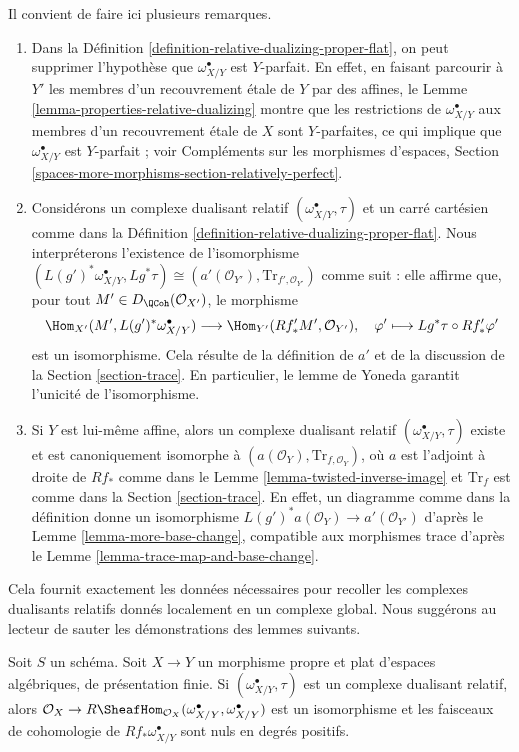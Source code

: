 \noindent
Il convient de faire ici plusieurs remarques.
\begin{enumerate}
\item Dans la Définition \ref{definition-relative-dualizing-proper-flat},
on peut supprimer l'hypothèse que $\omega_{X/Y}^\bullet$ est $Y$-parfait.
En effet, en faisant parcourir à $Y'$ les membres d'un recouvrement \'etale de $Y$
par des affines, le Lemme \ref{lemma-properties-relative-dualizing} montre
que les restrictions de $\omega_{X/Y}^\bullet$ aux membres d'un
recouvrement \'etale de $X$ sont $Y$-parfaites, ce qui implique que
$\omega_{X/Y}^\bullet$ est $Y$-parfait ; voir
Compléments sur les morphismes d'espaces, Section
\ref{spaces-more-morphisms-section-relatively-perfect}.
\item Considérons un complexe dualisant relatif
$(\omega_{X/Y}^\bullet, \tau)$ et un carré cartésien comme dans la
Définition \ref{definition-relative-dualizing-proper-flat}.
Nous interpréterons l'existence de l'isomorphisme
$(L(g')^*\omega_{X/Y}^\bullet, Lg^*\tau) \cong
(a'(\mathcal{O}_{Y'}), \text{Tr}_{f', \mathcal{O}_{Y'}})$
comme suit : elle affirme que, pour tout $M' \in D_\QCoh(\mathcal{O}_{X'})$,
le morphisme
$$
\Hom_{X'}(M', L(g')^*\omega_{X/Y}^\bullet)
\longrightarrow
\Hom_{Y'}(Rf'_*M', \mathcal{O}_{Y'}),\quad
\varphi' \longmapsto Lg^*\tau \circ Rf'_*\varphi'
$$
est un isomorphisme. Cela résulte de la définition de $a'$
et de la discussion de la Section \ref{section-trace}. En particulier,
le lemme de Yoneda garantit l'unicité de l'isomorphisme.
\item Si $Y$ est lui-même affine, alors un complexe dualisant relatif
$(\omega_{X/Y}^\bullet, \tau)$ existe et est canoniquement isomorphe
à $(a(\mathcal{O}_Y), \text{Tr}_{f, \mathcal{O}_Y})$, où
$a$ est l'adjoint à droite de $Rf_*$ comme dans le
Lemme \ref{lemma-twisted-inverse-image}
et $\text{Tr}_f$ est comme dans la Section \ref{section-trace}.
En effet, un diagramme comme dans la définition donne
un isomorphisme $L(g')^*a(\mathcal{O}_Y) \to a'(\mathcal{O}_{Y'})$ d'après le
Lemme \ref{lemma-more-base-change},
compatible aux morphismes trace d'après le
Lemme \ref{lemma-trace-map-and-base-change}.
\end{enumerate}
Cela fournit exactement les données nécessaires pour recoller les
complexes dualisants relatifs donnés localement en un complexe global. Nous suggérons au lecteur
de sauter les démonstrations des lemmes suivants.

\begin{lemma}
\label{lemma-relative-dualizing-RHom}
Soit $S$ un schéma. Soit $X \to Y$ un morphisme propre et plat
d'espaces algébriques, de présentation finie.
Si $(\omega_{X/Y}^\bullet, \tau)$ est un complexe dualisant relatif,
alors $\mathcal{O}_X \to
R\SheafHom_{\mathcal{O}_X}(\omega_{X/Y}^\bullet, \omega_{X/Y}^\bullet)$
est un isomorphisme et les faisceaux de cohomologie de $Rf_*\omega_{X/Y}^\bullet$
sont nuls en degrés positifs.
\end{lemma}

